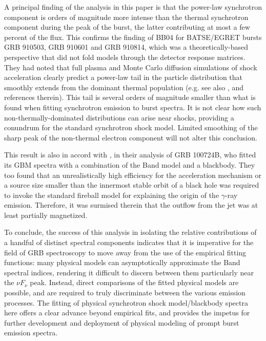 A principal finding of the analysis in this paper is that the
power-law synchrotron component is orders of magnitude more intense
than the thermal synchrotron component during the peak of the burst,
the latter contributing at most a few percent of the flux. This
confirms the finding of BB04 for BATSE/EGRET bursts GRB 910503, GRB
910601 and GRB 910814, which was a theoretically-based perspective
that did not fold models through the detector response matrices. They
had noted that full plasma and Monte Carlo diffusion simulations of
shock acceleration clearly predict a power-law tail in the particle
distribution that smoothly extends from the dominant thermal
population (e.g. see also \cite{Baring:2011}, and references therein).
This tail is several orders of magnitude smaller than what is found
when fitting synchrotron emission to burst spectra. It is not clear
how such non-thermally-dominated distributions can arise near shocks,
providing a conundrum for the standard synchrotron shock
model. Limited smoothing of the sharp peak of the non-thermal electron
component will not alter this conclusion.


This result is also in accord with \cite{Guiriec:2010}, in their
analysis of GRB 100724B, who fitted its GBM spectra with a
combination of the Band model and a blackbody. They too found that an
unrealistically high efficiency for the acceleration mechanism or 
a source size smaller than the innermost stable orbit of
a black hole was required to invoke the standard fireball model for
explaining the origin of the $\gamma$-ray emission. Therefore, it was
surmised therein that the outflow from the jet was at least partially
magnetized.

To conclude, the success of this analysis in isolating the relative
contributions of a handful of distinct spectral components indicates
that it is imperative for the field of GRB spectroscopy to move away
from the use of the empirical fitting functions: many physical models
can asymptotically approximate the Band spectral indices, rendering it
difficult to discern between them particularly near the $\nu F_{\nu}$
peak. Instead, direct comparisons of the fitted physical models are
possible, and are required to truly discriminate between the various
emission processes. The fitting of physical synchrotron shock
model/blackbody spectra here offers a clear advance beyond empirical
fits, and provides the impetus for further development and deployment
of physical modeling of prompt burst emission spectra.


